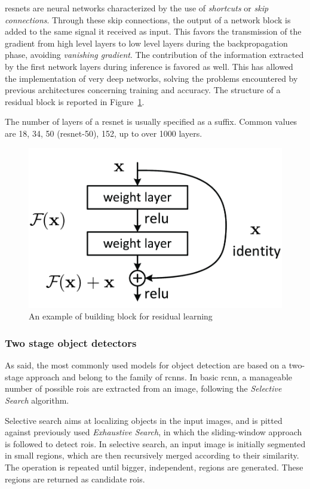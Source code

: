 \documentclass[%
    corpo=12pt,
    twoside,
    stile=classica,   
    tipotesi=magistrale,
    evenboxes,
    english,
	numerazioneromana,
]{toptesi}
\begin{document}
\Glspl{resnet} are neural networks characterized by the use of \textit{shortcuts} or \textit{skip connections}. Through these skip connections, the output of a network block is added to the same signal it received as input. This favors the transmission of the gradient from high level layers to low level layers during the backpropagation phase, avoiding \textit{vanishing gradient}. The contribution of the information extracted by the first network layers during inference is favored as well. This has allowed the implementation of very deep networks, solving the problems encountered by previous architectures concerning training and accuracy. The structure of a residual block is reported in Figure~\ref{fig:resnet}.

The number of layers of a \gls{resnet} is usually specified as a suffix. Common values are 18, 34, 50 (\gls{resnet}-50), 152, up to over 1000 layers\cite{he2016identity}.

\begin{figure}[ht]
	\centering
	\includegraphics[width=.5\textwidth]{imgs/resnet.png}
	\caption{An example of building block for residual learning\cite{he2015deep}}
	\label{fig:resnet}
\end{figure}

\subsubsection{Two stage object detectors}
As said, the most commonly used models for object detection are based on a two-stage approach and belong to the family of \glspl{rcnn}. In basic \gls{rcnn}\cite{girshick2014rich}, a manageable number of possible \glspl{roi} are extracted from an image, following the \textit{Selective Search} algorithm.

Selective search aims at localizing objects in the input images, and is pitted against previously used \textit{Exhaustive Search}, in which the sliding-window approach is followed to detect \glspl{roi}. In selective search, an input image is initially segmented in small regions, which are then recursively merged according to their similarity. The operation is repeated until bigger, independent, regions are generated. These regions are returned as candidate \glspl{roi}.
\end{document}

